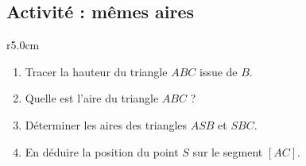 
\subsection*{Activité : mêmes aires}

\begin{wrapfigure}{r}{5.0cm}
   \vspace{-0.5cm}        %
   \centering
   
\end{wrapfigure}

\begin{enumerate}
    \item
        Tracer la hauteur du triangle \( ABC\) issue de \( B\).
    \item
        Quelle est l'aire du triangle \( ABC\) ?
    \item
        Déterminer les aires des triangles \( ASB\) et \( SBC\).
    \item
        En déduire la position du point \( S\) sur le segment \( [AC]\).
\end{enumerate}

\vspace{3cm}
